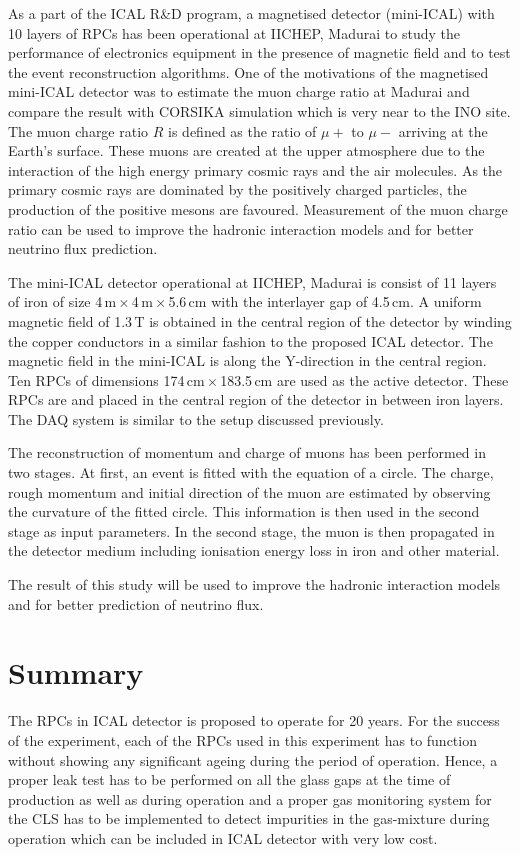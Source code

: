 \documentclass[a4paper,12pt,twoside,openany]{article}
\begin{document}
As a part of the ICAL R\&D program, a magnetised detector (mini-ICAL) with 10 layers of RPCs has been operational at IICHEP, Madurai to study the performance of electronics equipment in the presence of magnetic field and to test the event reconstruction algorithms. One of the motivations of the magnetised mini-ICAL detector was to estimate the muon charge ratio at Madurai and compare the result with CORSIKA simulation which is very near to the INO site. The muon charge ratio $R$ is defined as the ratio of $\mu+$ to $\mu-$ arriving at the Earth's surface. These muons are created at the upper atmosphere due to the interaction of the high energy primary cosmic rays and the air molecules. As the primary cosmic rays are dominated by the positively charged particles, the production of the positive mesons are favoured. Measurement of the muon charge ratio can be used to improve the hadronic interaction models and for better neutrino flux prediction.

The mini-ICAL detector operational at IICHEP, Madurai is consist of 11 layers of iron of size 4\,m\,$\times$\,4\,m\,$\times$\,5.6\,cm with the interlayer gap of 4.5\,cm. A uniform magnetic field of 1.3\,T is obtained in the central region of the detector by winding the copper conductors in a similar fashion to the proposed ICAL detector. The magnetic field in the mini-ICAL is along the Y-direction in the central region. Ten RPCs of dimensions 174\,cm\,$\times$\,183.5\,cm are used as the active detector. These RPCs are and placed in the central region of the detector in between iron layers. The DAQ system is similar to the setup discussed previously.

The reconstruction of momentum and charge of muons has been performed in two stages. At first, an event is fitted with the equation of a circle. The charge, rough momentum and initial direction of the muon are estimated by observing the curvature of the fitted circle. This information is then used in the second stage as input parameters. In the second stage, the muon is then propagated in the detector medium including ionisation energy loss in iron and other material.

The result of this study will be used to improve the hadronic interaction models and for better prediction of neutrino flux.

\section{Summary}
The RPCs in ICAL detector is proposed to operate for 20 years. For the success of the experiment, each of the RPCs used in this experiment has to function without showing any significant ageing during the period of operation. Hence, a proper leak test has to be performed on all the glass gaps at the time of production as well as during operation and a proper gas monitoring system for the CLS has to be implemented to detect impurities in the gas-mixture during operation which can be included in ICAL detector with very low cost.
\end{document}
